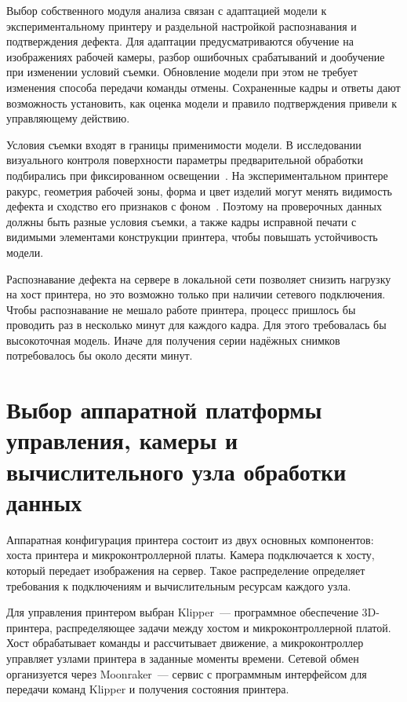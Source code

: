 Выбор собственного модуля анализа связан с адаптацией модели к экспериментальному принтеру и раздельной настройкой распознавания и подтверждения дефекта. Для адаптации предусматриваются обучение на изображениях рабочей камеры, разбор ошибочных срабатываний и дообучение при изменении условий съемки. Обновление модели при этом не требует изменения способа передачи команды отмены. Сохраненные кадры и ответы дают возможность установить, как оценка модели и правило подтверждения привели к управляющему действию.

Условия съемки входят в границы применимости модели. В исследовании визуального контроля поверхности параметры предварительной обработки подбирались при фиксированном освещении~\cite{измайлов2020анализ}. На экспериментальном принтере ракурс, геометрия рабочей зоны, форма и цвет изделий могут менять видимость дефекта и сходство его признаков с фоном~\cite{gabstur2024detection,zhang2024domain}. Поэтому на проверочных данных должны быть разные условия съемки, а также кадры исправной печати с видимыми элементами конструкции принтера, чтобы повышать устойчивость модели.

Распознавание дефекта на сервере в локальной сети позволяет снизить нагрузку на хост принтера, но это возможно только при наличии сетевого подключения. Чтобы распознавание не мешало работе принтера, процесс пришлось бы проводить раз в несколько минут для каждого кадра. Для этого требовалась бы высокоточная модель. Иначе для получения серии надёжных снимков потребовалось бы около десяти минут.

\section{Выбор аппаратной платформы управления, камеры и вычислительного узла обработки данных}

Аппаратная конфигурация принтера состоит из двух основных компонентов: хоста принтера и  микроконтроллерной платы. Камера подключается к хосту, который передает изображения на сервер. Такое распределение определяет требования к подключениям и вычислительным ресурсам каждого узла.

Для управления принтером выбран Klipper~--- программное обеспечение 3D-принтера, распределяющее задачи между хостом и микроконтроллерной платой. Хост обрабатывает команды и рассчитывает движение, а микроконтроллер управляет узлами принтера в заданные моменты времени. Сетевой обмен организуется через Moonraker~--- сервис с программным интерфейсом для передачи команд Klipper и получения состояния принтера.

